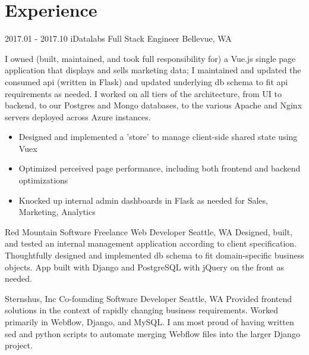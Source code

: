 \documentclass[10pt,a4paper,sans]{moderncv}        %
\begin{document}
\section{Experience}

\begin{comment}
  \cventry
  {date - date}
  {Employer}
  {Job Title}
  {}
  {City, State}
  {Description of work
    \begin{itemize}
    \item specific achievement
    \item specific achievement
    \end{itemize}}
\end{comment}

\cventry
{2017.01 - 2017.10}
{iDatalabs}
{Full Stack Engineer}
{}
{Bellevue, WA}
{I owned (built, maintained, and took full responsibility for) a Vue.js single
  page application that displays and sells marketing data; I maintained and
  updated the consumed api (written in Flask) and updated underlying db schema
  to fit api requirements as needed. I worked on all tiers of the architecture,
  from UI to backend, to our Postgres and Mongo databases, to the various Apache
  and Nginx servers deployed across Azure instances.
  \begin{itemize}
  \item Designed and implemented a 'store' to manage client-side shared state
    using Vuex
  \item Optimized perceived page performance, including both frontend and
    backend optimizations
  \item Knocked up internal admin dashboards in Flask as needed for Sales,
    Marketing, Analytics
  \end{itemize}}

 {Red Mountain Software} {Freelance Web Developer}
{} {Seattle, WA}
{Designed, built, and tested an internal management application according to
  client specification. Thoughtfully designed and implemented db schema to
  fit domain-specific business objects. App built with Django and PostgreSQL
  with jQuery on the front as needed.}

 {Sternshus, Inc} {Co-founding Software Developer}
{}
{Seattle, WA}
{Provided frontend solutions in the context of rapidly changing business
  requirements. Worked primarily in Webflow, Django, and MySQL. I am most proud
  of having written sed and python scripts to automate merging Webflow files
  into the larger Django project.}
\end{document}
